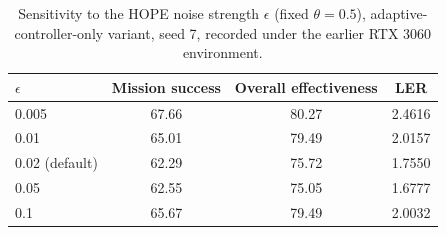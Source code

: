 \begin{table}[t]
\centering
\caption{Sensitivity to the HOPE noise strength $\epsilon$ (fixed $\theta=0.5$), adaptive-controller-only variant, seed 7, recorded under the earlier RTX 3060 environment.}
\label{tab:hyperparam-epsilon}
\small
\begin{tabular}{lccc}
\toprule
$\epsilon$ & Mission success & Overall effectiveness & LER \\
\midrule
0.005 & 67.66 & 80.27 & 2.4616 \\
0.01 & 65.01 & 79.49 & 2.0157 \\
0.02 (default) & 62.29 & 75.72 & 1.7550 \\
0.05 & 62.55 & 75.05 & 1.6777 \\
0.1 & 65.67 & 79.49 & 2.0032 \\
\bottomrule
\end{tabular}
\end{table}
